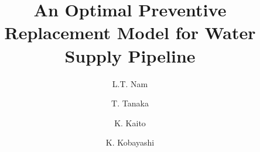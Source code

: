 \documentclass[a4paper,oneside,onecolumn,preprint,10pt,authoryear]{elsarticle}
\begin{document}
\begin{frontmatter}



\title{An Optimal Preventive Replacement Model for Water Supply Pipeline}

\author[nam]{L.T. Nam }
\author[tanaka]{T. Tanaka}
\author[kaito]{K. Kaito  }
\author[kobayashi]{K. Kobayashi }

\address[nam]{Department of Urban Management, Graduate School of Engineering, Kyoto University, Japan}
\address[tanaka]{Department of Urban Management, Graduate School of Engineering, Kyoto University, Japan}
\address[kaito]{Frontier Research Center, Osaka University, Japan}
\address[kobayashi]{Department of Urban Management, Graduate School of Engineering, Kyoto University, Japan}


\end{frontmatter}
\end{document}
